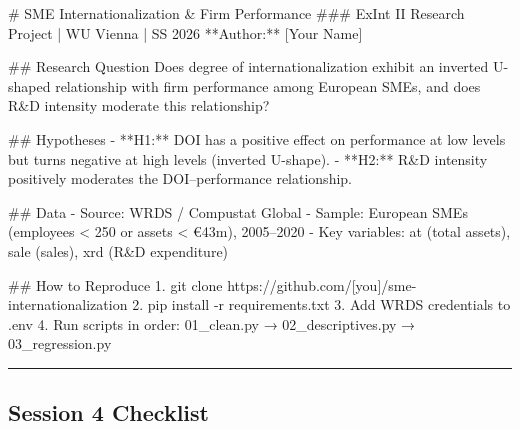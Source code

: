 \documentclass[
  letterpaper,
  DIV=11,
  numbers=noendperiod]{scrartcl}
\newenvironment{Shaded}{\begin{snugshade}}{\end{snugshade}}
\newcommand{\CommentTok}[1]{\textcolor[rgb]{0.37,0.37,0.37}{#1}}
\newcommand{\FunctionTok}[1]{\textcolor[rgb]{0.28,0.35,0.67}{#1}}
\newcommand{\InformationTok}[1]{\textcolor[rgb]{0.37,0.37,0.37}{#1}}
\newcommand{\NormalTok}[1]{\textcolor[rgb]{0.00,0.23,0.31}{#1}}
\newcommand{\OtherTok}[1]{\textcolor[rgb]{0.00,0.23,0.31}{#1}}
\newcommand{\SpecialStringTok}[1]{\textcolor[rgb]{0.13,0.47,0.30}{#1}}
\begin{document}
\begin{Shaded}
\begin{Highlighting}[]
\FunctionTok{\# SME Internationalization \& Firm Performance}
\FunctionTok{\#\#\# ExInt II Research Project | WU Vienna | SS 2026}
\NormalTok{**Author:** }\CommentTok{[}\OtherTok{Your Name}\CommentTok{]}

\FunctionTok{\#\# Research Question}
\NormalTok{Does degree of internationalization exhibit an inverted U{-}shaped relationship}
\NormalTok{with firm performance among European SMEs, and does R\&D intensity moderate}
\NormalTok{this relationship?}

\FunctionTok{\#\# Hypotheses}
\SpecialStringTok{{-} }\NormalTok{**H1:** DOI has a positive effect on performance at low levels but turns}
\NormalTok{  negative at high levels (inverted U{-}shape).}
\SpecialStringTok{{-} }\NormalTok{**H2:** R\&D intensity positively moderates the DOI–performance relationship.}

\FunctionTok{\#\# Data}
\SpecialStringTok{{-} }\NormalTok{Source: WRDS / Compustat Global}
\SpecialStringTok{{-} }\NormalTok{Sample: European SMEs (employees \textless{} 250 or assets \textless{} €43m), 2005–2020}
\SpecialStringTok{{-} }\NormalTok{Key variables: }\InformationTok{\textasciigrave{}at\textasciigrave{}}\NormalTok{ (total assets), }\InformationTok{\textasciigrave{}sale\textasciigrave{}}\NormalTok{ (sales), }\InformationTok{\textasciigrave{}xrd\textasciigrave{}}\NormalTok{ (R\&D expenditure)}

\FunctionTok{\#\# How to Reproduce}
\SpecialStringTok{1. }\InformationTok{\textasciigrave{}git clone https://github.com/[you]/sme{-}internationalization\textasciigrave{}}
\SpecialStringTok{2. }\InformationTok{\textasciigrave{}pip install {-}r requirements.txt\textasciigrave{}}
\SpecialStringTok{3. }\NormalTok{Add WRDS credentials to }\InformationTok{\textasciigrave{}.env\textasciigrave{}}
\SpecialStringTok{4. }\NormalTok{Run scripts in order: }\InformationTok{\textasciigrave{}01\_clean.py\textasciigrave{}}\NormalTok{ → }\InformationTok{\textasciigrave{}02\_descriptives.py\textasciigrave{}}\NormalTok{ → }\InformationTok{\textasciigrave{}03\_regression.py\textasciigrave{}}
\end{Highlighting}
\end{Shaded}

\begin{center}\rule{0.5\linewidth}{0.5pt}\end{center}

\subsection{Session 4 Checklist}\label{session-4-checklist}
\end{document}
